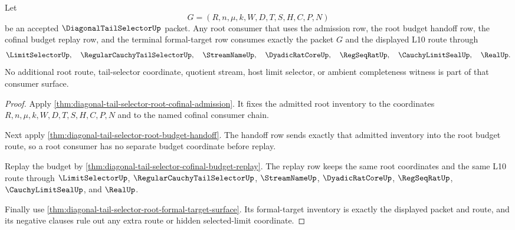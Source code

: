 \begin{theorem}
\label{thm:diagonal-tail-selector-root-budget-route-totality}
Let
$$
G=(R,n,\mu,k,W,D,T,S,H,C,P,N)
$$
be an accepted $\DiagonalTailSelectorUp$ packet. Any root consumer that uses
the admission row, the root budget handoff row, the cofinal budget replay row,
and the terminal formal-target row consumes exactly the packet $G$ and the
displayed L10 route through
$$
\LimitSelectorUp,\quad
\RegularCauchyTailSelectorUp,\quad
\StreamNameUp,\quad
\DyadicRatCoreUp,\quad
\RegSeqRatUp,\quad
\CauchyLimitSealUp,\quad
\RealUp.
$$
No additional root route, tail-selector coordinate, quotient stream, host
limit selector, or ambient completeness witness is part of that consumer
surface.
\end{theorem}
\begin{proof}
Apply \autoref{thm:diagonal-tail-selector-root-cofinal-admission}. It fixes
the admitted root inventory to the coordinates
$R,n,\mu,k,W,D,T,S,H,C,P,N$ and to the named cofinal consumer chain.

Next apply \autoref{thm:diagonal-tail-selector-root-budget-handoff}. The
handoff row sends exactly that admitted inventory into the root budget route,
so a root consumer has no separate budget coordinate before replay.

Replay the budget by
\autoref{thm:diagonal-tail-selector-cofinal-budget-replay}. The replay row
keeps the same root coordinates and the same L10 route through
$\LimitSelectorUp$, $\RegularCauchyTailSelectorUp$, $\StreamNameUp$,
$\DyadicRatCoreUp$, $\RegSeqRatUp$, $\CauchyLimitSealUp$, and $\RealUp$.

Finally use
\autoref{thm:diagonal-tail-selector-root-formal-target-surface}. Its
formal-target inventory is exactly the displayed packet and route, and its
negative clauses rule out any extra route or hidden selected-limit
coordinate.
\end{proof}

